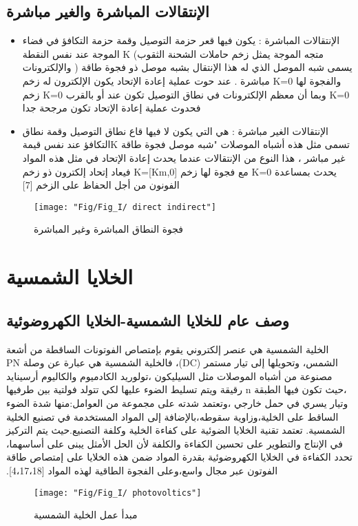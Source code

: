 	\subsection{ الإنتقالات المباشرة والغير مباشرة}
	\begin{itemize}
		\item  الإنتقالات المباشرة :
		يكون فيها قعر حزمة التوصيل وقمة حزمة التكافؤ في فضاء الموجة عند نفس النقطة K (متجه الموجة يمثل زخم حاملات الشحنة الثقوب والإلكترونات ) يسمى شبه الموصل الذي له هذا الإنتقال بشبه موصل ذو فجوة طاقة مباشرة . عند حوت عملية إعادة الإتحاد يكون الإلكترون له زخم K=0 والفجوة لها زخم K=0 وبما أن معظم الإلكترونات في نطاق التوصيل تكون عند أو بالقرب  K=0 فحدوث عملية إعادة الإتحاد تكون مرجحة جدا
		\item  الإنتقالات الغير مباشرة :
		هي التي يكون لا  فيها قاع نطاق التوصيل وقمة نطاق التكافؤ عند نفس قيمةK تسمى مثل هذه أشباه الموصلات "شبه موصل فجوة طاقة غير مباشر ، هذا النوع من الإنتقالات عندما يحدث إعادة الإتحاد في مثل هذه المواد فيعاد إتحاد إلكترون ذو زخم K=[Km,0] مع فجوة لها زخم K=0  يحدث بمساعدة الفونون من أجل الحفاظ على  الزخم
		[7]
	\end{itemize}
	\begin{figure}[h!]
		\centering
		\texttt{[image: "Fig/Fig\_I/ direct indirect"]}
		\caption{فجوة النطاق المباشرة وغير المباشرة}
		\label{fig:-direct-indirect}
	\end{figure}
	\FloatBarrier
	\section{ الخلايا الشمسية}
	\subsection{ وصف عام للخلايا الشمسية-الخلايا الكهروضوئية  }
	‫الخلية الشمسية هي عنصر إلكتروني يقوم بإمتصاص الفوتونات الساقطة من أشعة الشمس، وتحويلها إلى تيار مستمر (DC)،  
	فالخلية الشمسية هي عبارة عن وصلة PN مصنوعة من أشباه الموصلات مثل السيليكون ،تولوريد الكادميوم والكاليوم أرسينايد ،حيث تكون فيها الطبقة n رقيقة ويتم تسليط الضوء عليها لكي تتولد فولتية بين طرفيها وتيار يسري في حمل خارجي ،وتعتمد شدته على مجموعة من العوامل:منها شدة الضوء الساقط على الخلية،وزاوية سقوطه،بالإضافة إلى المواد المستخدمة في تصنيع الخلية الشمسية.
	تعتمد تقنية الخلايا الضوئية على كفاءة الخلية وكلفة التصنيع.حيث يتم التركيز في الإنتاج والتطوير على تحسين الكفاءة والكلفة ﻷن الحل الأمثل يبنى على أساسهما، تحدد الكفاءة في الخلايا الكهروضوئية بقدرة المواد ضمن هذه الخلايا على إمتصاص طاقة الفوتون عبر مجال واسع،وعلى الفجوة الطاقية لهذه المواد [4،17،18].
	\begin{figure}[h!]
		\centering
		\texttt{[image: "Fig/Fig\_I/ photovoltics"]}
		\caption{مبدأ عمل الخلية الشمسية}
		\label{fig:-photovoltics}
	\end{figure}
	\FloatBarrier
